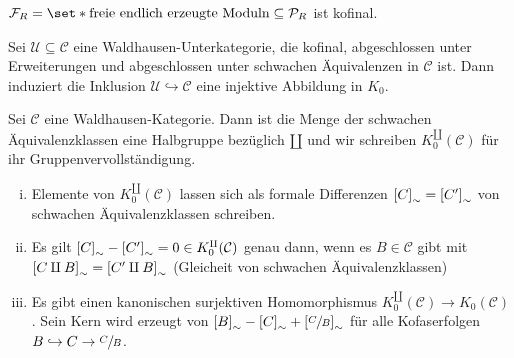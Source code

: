 \begin{beispiel}
	$\mathcal{F}_R = \set*{\text{freie endlich erzeugte Moduln}} \subseteq \mathcal{P}_R$ ist kofinal.
\end{beispiel}

\begin{satz}[name={Kofinalitätssatz für K0},label=kofinal_satz]
	Sei $\mathcal{U} \subseteq \mathcal{C}$ eine Waldhausen-Unterkategorie, die kofinal, abgeschlossen unter Erweiterungen und abgeschlossen unter schwachen Äquivalenzen in $\mathcal{C}$ ist.
	Dann induziert die Inklusion $\mathcal{U}\hookrightarrow \mathcal{C}$ eine injektive Abbildung in $K_0$.
\end{satz}

\begin{bemerkung}
	Sei $\mathcal{C}$ eine Waldhausen-Kategorie.
	Dann ist die Menge der schwachen Äquivalenzklassen eine Halbgruppe bezüglich $\amalg$ und wir schreiben $K^\amalg_0(\mathcal{C})$ für ihr Gruppenvervollständigung.
\end{bemerkung}

\begin{bemerkung}
	\begin{enumerate}[(i)]
		\item Elemente von $K_0^\amalg(\mathcal{C})$ lassen sich als formale Differenzen $\benbrace*{C}_\sim = \benbrace*{C'}_\sim$ von schwachen Äquivalenzklassen schreiben.
		\item Es gilt $\benbrace*{C}_\sim - \benbrace*{C'}_\sim =0 \in K^\amalg_0(\mathcal{C})$ genau dann, wenn es $B \in \mathcal{C}$ gibt mit $\benbrace*{C \amalg B}_\sim = \benbrace*{C' \amalg B}_\sim $ (Gleicheit von schwachen Äquivalenzklassen)
		\item Es gibt einen kanonischen surjektiven Homomorphismus $K_0^\amalg(\mathcal{C}) \to K_0(\mathcal{C})$.
		Sein Kern wird erzeugt von $\benbrace*{B}_\sim - \benbrace*{C}_\sim  + \benbrace*{\sfrac{C}{B}}_\sim$ für alle Kofaserfolgen $B \hookrightarrow C \to \sfrac{C}{B}$.
	\end{enumerate}
\end{bemerkung}

